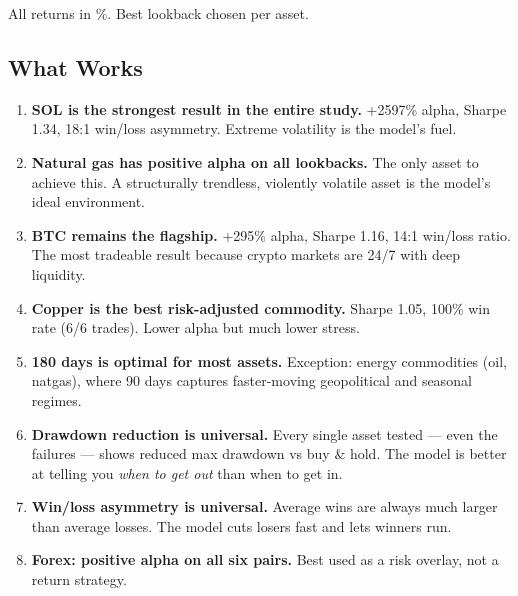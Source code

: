 \documentclass[11pt,a4paper]{article}
\begin{document}
\vspace{0.5em}
{\small All returns in \%. Best lookback chosen per asset.}

\vspace{1em}

\subsection{What Works}

\begin{enumerate}[leftmargin=2em]
    \item \textbf{SOL is the strongest result in the entire study.}
          +2597\% alpha, Sharpe 1.34, 18:1 win/loss asymmetry. Extreme
          volatility is the model's fuel.

    \item \textbf{Natural gas has positive alpha on all lookbacks.}
          The only asset to achieve this. A structurally trendless,
          violently volatile asset is the model's ideal environment.

    \item \textbf{BTC remains the flagship.} +295\% alpha, Sharpe
          1.16, 14:1 win/loss ratio. The most tradeable result because
          crypto markets are 24/7 with deep liquidity.

    \item \textbf{Copper is the best risk-adjusted commodity.} Sharpe
          1.05, 100\% win rate (6/6 trades). Lower alpha but much
          lower stress.

    \item \textbf{180 days is optimal for most assets.} Exception:
          energy commodities (oil, natgas), where 90 days captures
          faster-moving geopolitical and seasonal regimes.

    \item \textbf{Drawdown reduction is universal.} Every single asset
          tested --- even the failures --- shows reduced max drawdown
          vs buy \& hold. The model is better at telling you
          \emph{when to get out} than when to get in.

    \item \textbf{Win/loss asymmetry is universal.} Average wins are
          always much larger than average losses. The model cuts losers
          fast and lets winners run.

    \item \textbf{Forex: positive alpha on all six pairs.} Best used
          as a risk overlay, not a return strategy.
\end{enumerate}
\end{document}
